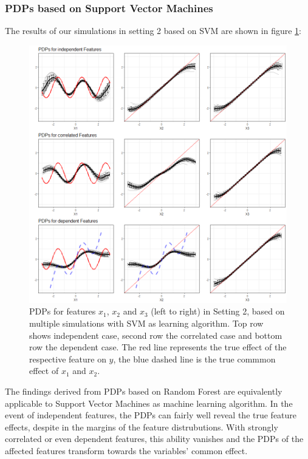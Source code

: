 \documentclass[]{krantz}
\begin{document}
\subsubsection{PDPs based on Support Vector
Machines}\label{pdps-based-on-support-vector-machines-1}

The results of our simulations in setting 2 based on SVM are shown in
figure \ref{fig:Figure18}:

\begin{figure}

\includegraphics[width=1\linewidth]{images/VK_PDP_18_Set2_SVM} \hfill{}

\caption{PDPs for features $x_1$, $x_2$ and $x_3$ (left to right) in Setting 2, based on multiple simulations with SVM as learning algorithm. Top row shows independent case, second row the correlated case and bottom row the dependent case. The red line represents the true effect of the respective feature on $y$, the blue dashed line is the true commmon effect of $x_1$ and $x_2$.}\label{fig:Figure18}
\end{figure}

The findings derived from PDPs based on Random Forest are equivalently
applicable to Support Vector Machines as machine learning algorithm. In
the event of independent features, the PDPs can fairly well reveal the
true feature effects, despite in the margins of the feature
distrubutions. With strongly correlated or even dependent features, this
ability vanishes and the PDPs of the affected features transform towards
the variables' common effect.
\end{document}
